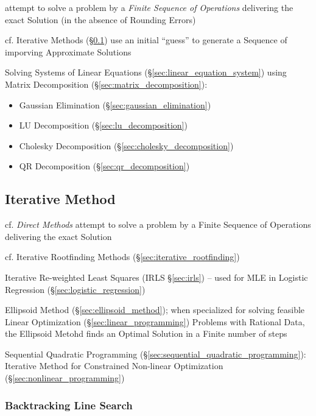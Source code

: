 {attempt to solve a problem by a \emph{Finite Sequence of Operations} delivering
the exact Solution (in the absence of Rounding Errors)

cf. Iterative Methods (\S\ref{sec:iterative_method}) use an initial ``guess'' to
generate a Sequence of imporving Approximate Solutions

Solving Systems of Linear Equations (\S\ref{sec:linear_equation_system})
using Matrix Decomposition (\S\ref{sec:matrix_decomposition}):
\begin{itemize}
  \item Gaussian Elimination (\S\ref{sec:gaussian_elimination})
  \item LU Decomposition (\S\ref{sec:lu_decomposition})
  \item Cholesky Decomposition (\S\ref{sec:cholesky_decomposition})
  \item QR Decomposition (\S\ref{sec:qr_decomposition})
\end{itemize}



\subsection{Iterative Method}\label{sec:iterative_method}

cf. \emph{Direct Methods} attempt to solve a problem by a Finite Sequence of
Operations delivering the exact Solution

\fist cf. Iterative Rootfinding Methods (\S\ref{sec:iterative_rootfinding})

\fist Iterative Re-weighted Least Squares (IRLS \S\ref{sec:irls}) -- used for
MLE in Logistic Regression (\S\ref{sec:logistic_regression})

\fist Ellipsoid Method (\S\ref{sec:ellipsoid_method}); when specialized for
solving feasible Linear Optimization (\S\ref{sec:linear_programming}) Problems
with Rational Data, the Ellipsoid Metohd finds an Optimal Solution in a Finite
number of steps

\fist Sequential Quadratic Programming
(\S\ref{sec:sequential_quadratic_programming}): Iterative Method for
Constrained Non-linear Optimization (\S\ref{sec:nonlinear_programming})



\subsubsection{Backtracking Line Search}\label{sec:backtracking_line_search}

}
